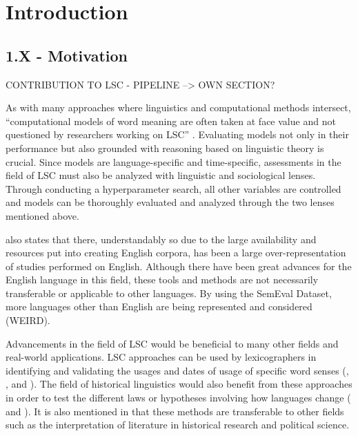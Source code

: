 
\section{Introduction}
\label{sec:intro}

\subsection{1.X - Motivation}
CONTRIBUTION TO LSC - PIPELINE --> OWN SECTION?

As with many approaches where linguistics and computational methods intersect, “computational models of word meaning are often taken at face value and not questioned by researchers working on LSC” \citep{hengchen2021challenges}. Evaluating models not only in their performance but also grounded with reasoning based on linguistic theory is crucial. Since models are language-specific and time-specific, assessments in the field of LSC must also be analyzed with linguistic and sociological lenses. Through conducting a hyperparameter search, all other variables are controlled and models can be thoroughly evaluated and analyzed through the two lenses mentioned above. 

\citet{hengchen2021challenges} also states that there, understandably so due to the large availability and resources put into creating English corpora, has been a large over-representation of studies performed on English. Although there have been great advances for the English language in this field, these tools and methods are not necessarily transferable or applicable to other languages. By using the SemEval Dataset, more languages other than English are being represented and considered (WEIRD).  

Advancements in the field of LSC would be beneficial to many other fields and real-world applications. LSC approaches can be used by lexicographers in identifying and validating the usages and dates of usage of specific word senses (\citet{lau-etal-2012-word}, \citet{falk-etal-2014-non}, and \citet{klosa-2018-newgerman}). The field of historical linguistics would also benefit from these approaches in order to test the different laws or hypotheses involving how languages change (\citet{hamilton-etal-2016-diachronic} and \citet{Xu2015ACE}). It is also mentioned in \citet{hengchen2021challenges} that these methods are transferable to other fields such as the interpretation of literature in historical research and political science.  

